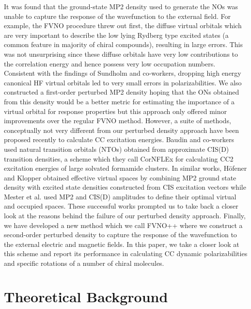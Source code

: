 It was found that the ground-state MP2 density used to generate the NOs was 
unable to capture the response of the wavefunction to the external field. 
For example, the FVNO procedure threw out first, the diffuse virtual 
orbitals which are very important to describe the low lying Rydberg type 
excited states (a common feature in majority of chiral compounds), 
resulting in large errors. This was not unsurprising since these diffuse 
orbitals have very low contributions to the correlation energy and hence 
possess very low occupation numbers. Consistent with the findings of Sundholm 
and co-workers\cite{Sundholm11}, dropping high energy canonical HF 
virtual orbitals led to very small errors in polarizabilities. 
We also constructed a first-order perturbed MP2 density hoping that 
the ONs obtained from this density would be a better metric for 
estimating the importance of a virtual orbital 
for response properties but this approach only offered
minor improvements over the regular FVNO method. However, 
a suite of methods, conceptually not very different from our 
perturbed density approach have been proposed recently 
to calculate CC excitation energies. Baudin and co-workers 
used natural transition orbitals (NTOs) obtained from approximate 
CIS(D) transition densities, a scheme which they call CorNFLEx for 
calculating CC2 excitation energies of large solvated formamide 
clusters\cite{Baudin17}. In similar works, H{\"o}fener and Klopper 
obtained effective virtual spaces by combining MP2 
ground state density with excited state densities constructed from CIS 
excitation vectors\cite{HofenerKlopper17} while Mester et al. used MP2 and CIS(D) amplitudes 
to define their optimal virtual and occupied spaces\cite{Mester17,Mester18}.
These successful works prompted us to take back a closer look at the 
reasons behind the failure of our perturbed density approach. 
Finally, we have developed a new method which we call FVNO++ 
where we construct a second-order perturbed density to 
capture the response of the wavefunction to the external electric 
and magnetic fields. In this paper, we take a closer look at this 
scheme and report its performance in calculating CC dynamic 
polarizabilities and specific rotations of a number of chiral molecules.
\section{Theoretical Background}
